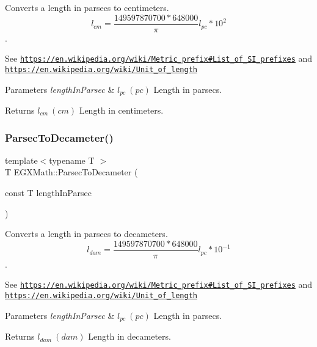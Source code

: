 Converts a length in parsecs to centimeters. \[ l_{cm}=\frac{149597870700 * 648000}{\pi}l_{pc} * 10^{2} \]. 

See \href{https://en.wikipedia.org/wiki/Metric_prefix#List_of_SI_prefixes}{\tt https\+://en.\+wikipedia.\+org/wiki/\+Metric\+\_\+prefix\#\+List\+\_\+of\+\_\+\+S\+I\+\_\+prefixes} and \href{https://en.wikipedia.org/wiki/Unit_of_length}{\tt https\+://en.\+wikipedia.\+org/wiki/\+Unit\+\_\+of\+\_\+length} 
\begin{DoxyParams}{Parameters}
{\em length\+In\+Parsec} & $ l_{pc}\ (pc)$ Length in parsecs. \\
\hline
\end{DoxyParams}
\begin{DoxyReturn}{Returns}
$ l_{cm}\ (cm)$ Length in centimeters. 
\end{DoxyReturn}
\mbox{\label{group___e_g_x_math-_conversions-_length_conversions-_astronomical-_parsec-_s_i_ga69437b0eb33c7cd5df74e32993f9b1e0}} 
\subsubsection{\texorpdfstring{Parsec\+To\+Decameter()}{ParsecToDecameter()}}
{\footnotesize\ttfamily template$<$typename T $>$ \\
T E\+G\+X\+Math\+::\+Parsec\+To\+Decameter (\begin{DoxyParamCaption}\item[{const T}]{length\+In\+Parsec }\end{DoxyParamCaption})}



Converts a length in parsecs to decameters. \[ l_{dam}=\frac{149597870700 * 648000}{\pi}l_{pc} * 10^{-1} \]. 

See \href{https://en.wikipedia.org/wiki/Metric_prefix#List_of_SI_prefixes}{\tt https\+://en.\+wikipedia.\+org/wiki/\+Metric\+\_\+prefix\#\+List\+\_\+of\+\_\+\+S\+I\+\_\+prefixes} and \href{https://en.wikipedia.org/wiki/Unit_of_length}{\tt https\+://en.\+wikipedia.\+org/wiki/\+Unit\+\_\+of\+\_\+length} 
\begin{DoxyParams}{Parameters}
{\em length\+In\+Parsec} & $ l_{pc}\ (pc)$ Length in parsecs. \\
\hline
\end{DoxyParams}
\begin{DoxyReturn}{Returns}
$ l_{dam}\ (dam)$ Length in decameters. 
\end{DoxyReturn}
\mbox{\label{group___e_g_x_math-_conversions-_length_conversions-_astronomical-_parsec-_s_i_gaedc7b871291866977df575d69f7eaf6f}} 
